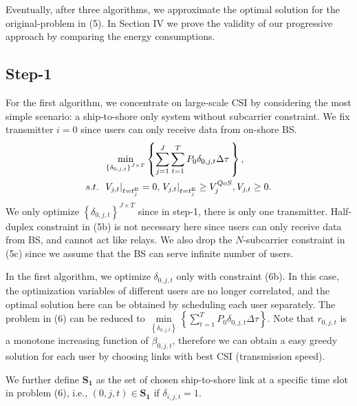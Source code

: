 \documentclass[conference]{IEEEtran}
\begin{document}
 Eventually, after three algorithms, we approximate the optimal solution for the original-problem in (5). In Section IV we prove the validity of our progressive approach by comparing the energy consumptions. 
 
 \subsection{Step-1}
 
 For the first algorithm, we concentrate on large-scale CSI by considering the most simple scenario: a ship-to-shore only system without subcarrier constraint. We fix transmitter $i = 0$ since users can only receive data from on-shore BS. 
 \begin{subequations}
 \begin{align}
 & \mathop {\min }\limits_{\left\{ {{\delta _{0,j,t}}} \right\}^{J \times T}} \left\{ {\sum\limits_{j = 1}^J {\sum\limits_{t = 1}^{T} {{P_{0}}\delta _{0,j,t} \Delta \tau } \,} } \right\} ,\\
  {s.t.} \;\; &{{{\left. {{V_{j,t}}} \right|}_{t = t_j^{{\rm{B}}}}} = 0,\left. { {V_{j,t}}} \right|_{t = t_j^{{\rm{E}}}}} \ge V_j^{QoS}, {V_{j,t}} \ge 0.
 \end{align}
 \end{subequations}
 We only optimize $\left\{ {{\delta _{0,j,t}}} \right\}^{J \times T}$ since in step-1, there is only one transmitter. 
 Half-duplex constraint in (5b) is not necessary here since users can only receive data from BS, and cannot act like relays. We also drop the $N$-subcarrier constraint in (5c) since we assume that the BS can serve infinite number of users. 
 
 In the first algorithm, we optimize ${\delta _{0,j,t}}$ only with constraint (6b). In this case, the optimization variables of different users are no longer correlated, and the optimal solution here can be obtained by scheduling each user separately. The problem in (6) can be reduced to $\mathop {\min }\limits_{{\left\{ {{\delta _{0,j,t}}} \right\}}} \left\{ {\sum\limits_{t = 1}^T {{P_{0}}\delta _{0,j,t} \Delta \tau } } \right\}$. Note that ${r_{0,j,t}}$ is a monotone increasing function of ${\beta _{0,j,t}}$, therefore we can obtain a easy greedy solution for each user by choosing links with best CSI (transmission speed). 
 
 We further define ${{\mathbf{S}}_{\mathbf{1}}}$ as the set of chosen ship-to-shore link at a specific time slot in problem (6), i.e., $\left( {0,j,t} \right) \in {\mathbf{S}}_{\mathbf{1}}$ if ${\delta _{i,j,t} = 1}$. 
 
\end{document}
